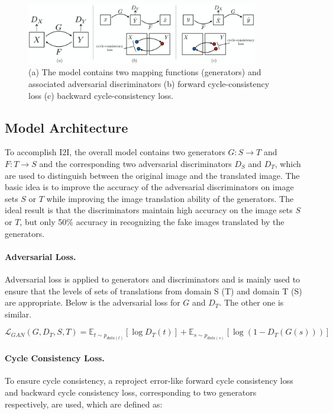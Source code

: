 \begin{figure}[!ht]
    \centering
    \includegraphics[width=0.9\textwidth]{Section2/cycleGAN.png}
    \caption{(a) The model contains two mapping functions (generators) and associated adversarial discriminators (b) forward cycle-consistency loss (c) backward cycle-consistency loss.}\label{figure:cyclegan}
\end{figure}

\subsection{Model Architecture}
To accomplish I2I, the overall model contains two generators $G: S \rightarrow T$ and $F: T \rightarrow S$ and the corresponding two adversarial discriminators $D_S$ and $D_T$, which are used to distinguish between the original image and the translated image. The basic idea is to improve the accuracy of the adversarial discriminators on image sets $S$ or $T$ while improving the image translation ability of the generators. The ideal result is that the discriminators maintain high accuracy on the image sets $S$ or $T$, but only 50\% accuracy in recognizing the fake images translated by the generators.

\paragraph{Adversarial Loss.}Adversarial loss is applied to generators and discriminators and is mainly used to ensure that the levels of sets of translations from domain S (T) and domain T (S)  are appropriate. Below is the adversarial loss for $G$ and $D_T$. The other one is similar.

\begin{equation}
    \mathcal{L}_{GAN}(G,D_T,S,T) = \mathbb{E}_{t \sim p_{data(t)}}[\log D_T(t)] + \mathbb{E}_{s \sim p_{data(s)}}[\log(1 - D_T(G(s)))]
\end{equation}

\paragraph{Cycle Consistency Loss.} 
To ensure cycle consistency, a reproject error-like forward cycle consistency loss and backward cycle consistency loss, corresponding to two generators respectively, are used, which are defined as:

